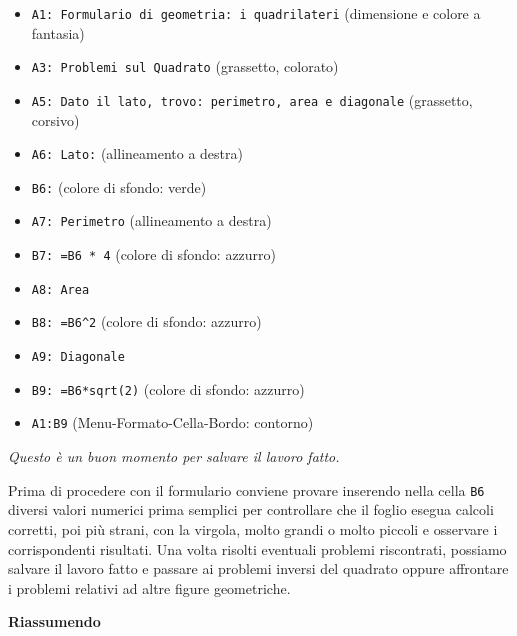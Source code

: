 \begin{itemize}
\item {}
\texttt{A1: Formulario di geometria: i quadrilateri}
(dimensione e colore a fantasia)

\item {}
\texttt{A3: Problemi sul Quadrato}
(grassetto, colorato)

\item {}
\texttt{A5: Dato il lato, trovo: perimetro, area e diagonale}
(grassetto, corsivo)

\item {}
\texttt{A6: Lato:}
(allineamento a destra)

\item {}
\texttt{B6:}
(colore di sfondo: verde)

\item {}
\texttt{A7: Perimetro}
(allineamento a destra)

\item {}
\texttt{B7: =B6 * 4}
(colore di sfondo: azzurro)

\item {}
\texttt{A8: Area}

\item {}
\texttt{B8: =B6\textasciicircum{}2}
(colore di sfondo: azzurro)

\item {}
\texttt{A9: Diagonale}

\item {}
\texttt{B9: =B6*sqrt(2)}
(colore di sfondo: azzurro)

\item {}
\texttt{A1:B9}
(Menu-Formato-Cella-Bordo: contorno)

\end{itemize}

\emph{Questo è un buon momento per salvare il lavoro fatto.}

Prima di procedere con il formulario conviene provare inserendo nella cella
\texttt{B6} diversi valori numerici prima semplici per controllare che il foglio
esegua calcoli corretti, poi più strani, con la virgola, molto grandi o
molto piccoli e osservare i corrispondenti risultati.
Una volta risolti eventuali problemi riscontrati, possiamo salvare il lavoro
fatto e passare ai problemi inversi del quadrato oppure
affrontare i problemi relativi ad altre figure geometriche.

\textbf{Riassumendo}

